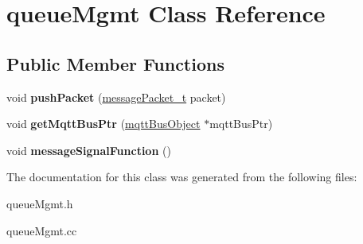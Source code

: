 \hypertarget{classqueueMgmt}{}\section{queue\+Mgmt Class Reference}
\label{classqueueMgmt}
\subsection*{Public Member Functions}
\begin{DoxyCompactItemize}
\item 
void {\bfseries push\+Packet} (\hyperlink{structmessagePacket__t}{message\+Packet\+\_\+t} packet)\hypertarget{classqueueMgmt_a4471e66f79783842310d0eea64b178f7}{}\label{classqueueMgmt_a4471e66f79783842310d0eea64b178f7}

\item 
void {\bfseries get\+Mqtt\+Bus\+Ptr} (\hyperlink{classmqttBusObject}{mqtt\+Bus\+Object} $\ast$mqtt\+Bus\+Ptr)\hypertarget{classqueueMgmt_afd6232c480afcec1cafae6b6b4a401f3}{}\label{classqueueMgmt_afd6232c480afcec1cafae6b6b4a401f3}

\item 
void {\bfseries message\+Signal\+Function} ()\hypertarget{classqueueMgmt_a9e7179a32cc54b38b96374e62b20fa32}{}\label{classqueueMgmt_a9e7179a32cc54b38b96374e62b20fa32}

\end{DoxyCompactItemize}


The documentation for this class was generated from the following files\+:\begin{DoxyCompactItemize}
\item 
queue\+Mgmt.\+h\item 
queue\+Mgmt.\+cc\end{DoxyCompactItemize}
